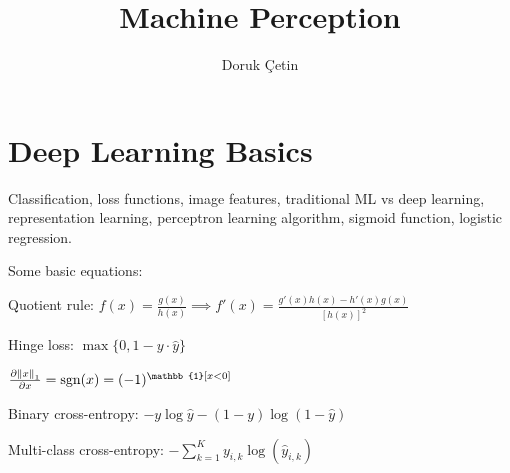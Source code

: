 \documentclass[12pt]{article}
\begin{document}
\rhead{\today}

\title{Machine Perception}
\author{Doruk Çetin}
\maketitle

\setcounter{tocdepth}{2}
\tableofcontents
\pagebreak

\section{Deep Learning Basics}
\par Classification, loss functions, image features, traditional ML vs deep learning, representation learning, perceptron learning algorithm, sigmoid function, logistic regression.
\par Some basic equations:
\ulb
\item Quotient rule: $f(x) = \frac{g(x)}{h(x)} \implies f'(x) = \frac{g'(x)h(x) - h'(x)g(x)}{[h(x)]^2}$
\item Hinge loss: $\max\{0, 1-y\cdot\hat{y}\}$
\item $\frac{\partial \bnorm{x}_1}{\partial x} = \text{sgn}(x) = (-1)^{\mathbb{1}[x<0]}$
\item Binary cross-entropy: $-y\log\hat{y} - (1-y)\log(1-\hat{y})$
\item Multi-class cross-entropy: $-\sum_{k=1}^K y_{i,k} \log (\hat{y}_{i,k})$
\ule
\end{document}
